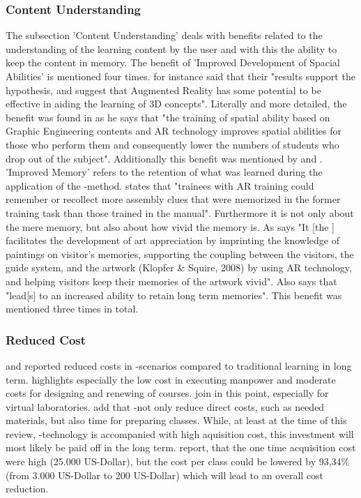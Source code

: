 \subsubsection{Content Understanding}
The subsection 'Content Understanding' deals with benefits related to the understanding of the learning content by the user and with this the ability to keep the content in memory.
The benefit of 'Improved Development of Spacial Abilities' is mentioned four times. \cite{Dunser.2012} for instance said that their "results support the hypothesis, and suggest that Augmented Reality has some potential to be effective 
in aiding the learning of 3D concepts"\autocite[112]{Dunser.2012}. Literally and more detailed, the benefit was found in \cite{MartinGutierrez.2011} as he says that "the training of spatial ability based on 
Graphic Engineering contents and AR technology improves spatial abilities for those who perform them and consequently lower the numbers of students who drop out of the subject"\autocite[5]{MartinGutierrez.2011}.
Additionally this benefit was mentioned by \cite[4]{MartinGutierrez.2013} and \cite[5]{Chen.2008}.
'Improved Memory' refers to the retention of what was learned during the application of the \ARns-method. \cite{Hou.2013} states that "trainees with AR training could remember or recollect more assembly 
clues that were memorized in the former training task than those trained in the manual"\autocite[450]{Hou.2013}. Furthermore it is not only about the mere memory, but also about how vivid the memory is. As \cite{Chang.2014}
says "It [the \AR \app] facilitates the development of art appreciation by imprinting the knowledge of paintings on visitor's memories, supporting the coupling between the visitors, the guide system, and the artwork (Klopfer \& Squire, 2008) by using 
AR technology, and helping visitors keep their memories of the artwork vivid"\autocite[193]{Chang.2014}. Also \cite{Macchiarella.2005} says that \AR "lead[s] to an increased ability to retain long term memories".
This benefit was mentioned three times in total.

% 
\subsubsection{Reduced Cost}
\cite{Leblanc.2010} and \cite{MartinGutierrez.2011} reported reduced costs in \ARns-scenarios compared to traditional learning in long term. \cite{Chen.2012} highlights especially the low cost in executing manpower and moderate costs for designing and renewing of courses.\autocite[cf.][640]{Chen.2012} \cite{Andujar.2011} join in this point, especially for virtual laboratories.\autocite[cf.][492]{Andujar.2011} \cite{Andujar.2011} add that \ARns-\apps not only reduce direct costs, such as needed materials, but also time for preparing classes. While, at least at the time of this review, \ARns-technology is accompanied with high aquisition cost, this investment will most likely be paid off in the long term. \cite{Leblanc.2010} report, that the one time acquisition cost were high (25.000 US-Dollar)\autocite[253]{Leblanc.2010}, but the cost per class could be lowered by 93,34\% (from 3.000 US-Dollar to 200 US-Dollar)\autocite[253]{Leblanc.2010} which will lead to an overall cost reduction.